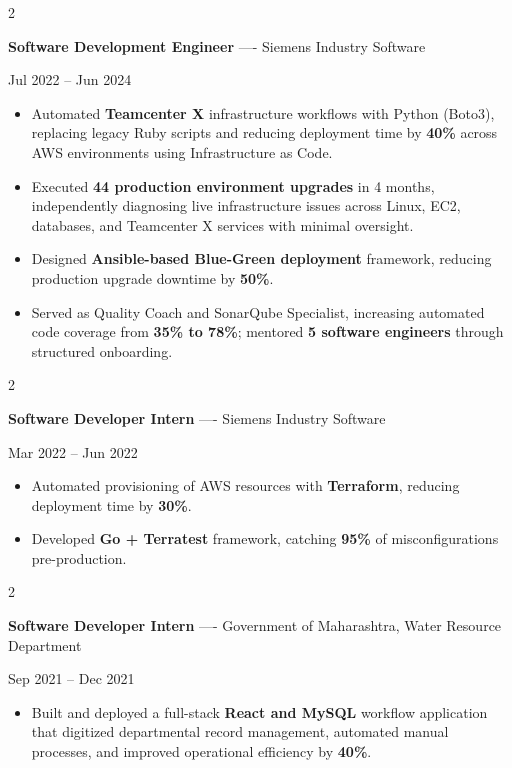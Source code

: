 \documentclass[10pt, letterpaper]{article}
\newenvironment{highlights}{
    \begin{itemize}[
        topsep=0.10 cm,
        parsep=0.06 cm,
        partopsep=0pt,
        itemsep=0.06 cm,
        leftmargin=12pt
    ]
}{
    \end{itemize}
}
\newenvironment{twocolentry}[2][]{
    \onecolentry
    \def\secondColumn{#2}
    \setcolumnwidth{\fill, 4.5 cm}
    \begin{paracol}{2}
}{
    \switchcolumn \raggedleft \secondColumn
    \end{paracol}
    \endonecolentry
}
\begin{document}
\vspace{0.15 cm}

\begin{twocolentry}{Jul 2022 -- Jun 2024}
\textbf{Software Development Engineer} ---- Siemens Industry Software
\end{twocolentry}
\begin{highlights}
  \item Automated \textbf{Teamcenter X} infrastructure workflows with Python (Boto3), replacing legacy Ruby scripts and reducing deployment time by \textbf{40\%} across AWS environments using Infrastructure as Code.
  \item Executed \textbf{44 production environment upgrades} in 4 months, independently diagnosing live infrastructure issues across Linux, EC2, databases, and Teamcenter X services with minimal oversight.
  \item Designed \textbf{Ansible-based Blue-Green deployment} framework, reducing production upgrade downtime by \textbf{50\%}.
  \item Served as Quality Coach and SonarQube Specialist, increasing automated code coverage from \textbf{35\% to 78\%}; mentored \textbf{5 software engineers} through structured onboarding.
\end{highlights}

\vspace{0.15 cm}

\begin{twocolentry}{Mar 2022 -- Jun 2022}
\textbf{Software Developer Intern} ---- Siemens Industry Software
\end{twocolentry}
\begin{highlights}
  \item Automated provisioning of AWS resources with \textbf{Terraform}, reducing deployment time by \textbf{30\%}.
  \item Developed \textbf{Go + Terratest} framework, catching \textbf{95\%} of misconfigurations pre-production.
\end{highlights}

\vspace{0.15 cm}

\begin{twocolentry}{Sep 2021 -- Dec 2021}
\textbf{Software Developer Intern} ---- Government of Maharashtra, Water Resource Department
\end{twocolentry}
\begin{highlights}
  \item Built and deployed a full-stack \textbf{React and MySQL} workflow application that digitized departmental record management, automated manual processes, and improved operational efficiency by \textbf{40\%}.
\end{highlights}
\end{document}
